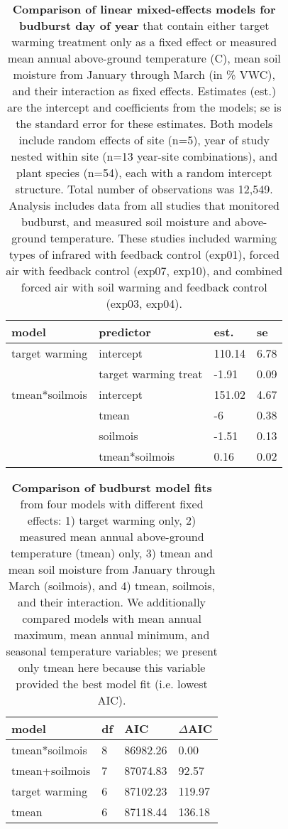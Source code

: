 \documentclass{article}
\begin{document}
\begin{table}[ht]
\centering
\caption{\textbf{Comparison of linear mixed-effects models for budburst day of year} that contain either target warming treatment only as a fixed effect or measured mean annual above-ground temperature (\degree C), mean soil moisture from January through March (in \% VWC), and their interaction as fixed effects. Estimates (est.) are the intercept and coefficients from the models; se is the standard error for these estimates. Both models include random effects of site (n=5), year of study nested within site (n=13 year-site combinations), and plant species (n=54), each with a random intercept structure. Total number of observations was 12,549. Analysis includes data from all studies that monitored budburst, and measured soil moisture and above-ground temperature. These studies included warming types of infrared with feedback control (exp01), forced air with feedback control (exp07, exp10), and combined forced air with soil warming and feedback control (exp03, exp04).} 
\label{table:bbmods}
\begingroup\footnotesize
\begin{tabular}{|p{}|p{}|p{}|p{}|}
  \hline
model & predictor & est. & se \\ 
  \hline
target warming & intercept & 110.14 & 6.78 \\ 
   & target warming treat & -1.91 & 0.09 \\ 
   \hline
tmean*soilmois & intercept & 151.02 & 4.67 \\ 
   & tmean & -6 & 0.38 \\ 
   & soilmois & -1.51 & 0.13 \\ 
   & tmean*soilmois & 0.16 & 0.02 \\ 
   \hline
\end{tabular}
\endgroup
\end{table}
\begin{table}[ht]
\centering
\caption{\textbf{Comparison of budburst model fits} from four models with different fixed effects: 1) target warming only, 2) measured mean annual above-ground temperature (tmean) only, 3) tmean and mean soil moisture from January through March (soilmois), and 4) tmean, soilmois, and their interaction. We additionally compared models with mean annual maximum, mean annual minimum, and seasonal temperature variables; we present only tmean here because this variable provided the best model fit (i.e. lowest AIC).} 
\label{table:bbaic}
\begingroup\footnotesize
\begin{tabular}{|p{}|p{}|p{}|p{}|}
  \hline
model & df & AIC & $\Delta$AIC \\ 
  \hline
tmean*soilmois & 8 & 86982.26 & 0.00 \\ 
  tmean+soilmois & 7 & 87074.83 & 92.57 \\ 
  target warming & 6 & 87102.23 & 119.97 \\ 
  tmean & 6 & 87118.44 & 136.18 \\ 
   \hline
\end{tabular}
\endgroup
\end{table}\clearpage
\clearpage
\end{document}
